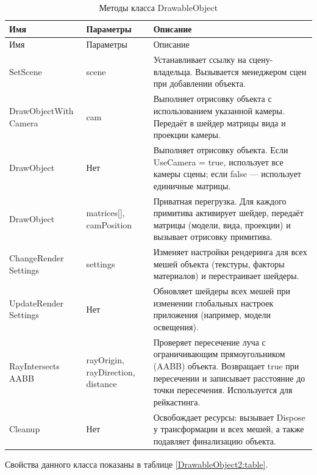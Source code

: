 \begin{xltabular}{\textwidth}{|>{\raggedright\arraybackslash}p{3.5cm}|>{\raggedright\arraybackslash}p{3.5cm}|>{\raggedright\arraybackslash}X|}
	\caption{Методы класса DrawableObject\label{DrawableObject1:table}}\\ \hline
	\centrow Имя & \centrow Параметры & \centrow Описание \\ \hline
	\endfirsthead
	\centrow Имя & \centrow Параметры & \centrow Описание \\ \hline 
	\finishhead
	SetScene & scene & Устанавливает ссылку на сцену-владельца. Вызывается менеджером сцен при добавлении объекта. \\
	\hline
	DrawObjectWith
	Camera & cam & Выполняет отрисовку объекта с использованием указанной камеры. Передаёт в шейдер матрицы вида и проекции камеры. \\
	\hline
	DrawObject & Нет & Выполняет отрисовку объекта. Если UseCamera = true, использует все камеры сцены; если false — использует единичные матрицы. \\
	\hline
	DrawObject & matrices[], camPosition & Приватная перегрузка. Для каждого примитива активирует шейдер, передаёт матрицы (модели, вида, проекции) и вызывает отрисовку примитива. \\
	\hline
	ChangeRender
	Settings & settings & Изменяет настройки рендеринга для всех мешей объекта (текстуры, факторы материалов) и перестраивает шейдеры. \\
	\hline
	UpdateRender
	Settings & Нет & Обновляет шейдеры всех мешей при изменении глобальных настроек приложения (например, модели освещения). \\
	\hline
	RayIntersects
	AABB & rayOrigin, rayDirection, distance & Проверяет пересечение луча с ограничивающим прямоугольником (AABB) объекта. Возвращает true при пересечении и записывает расстояние до точки пересечения. Используется для рейкастинга. \\
	\hline
	Cleanup & Нет & Освобождает ресурсы: вызывает Dispose у трансформации и всех мешей, а также подавляет финализацию объекта.
\end{xltabular}

Свойства данного класса показаны в таблице \ref{DrawableObject2:table}.

